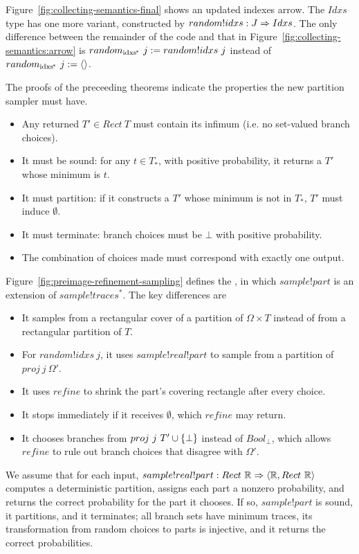 Figure~\ref{fig:collecting-semantics-final} shows an updated indexes arrow.
The $Idxs$ type has one more variant, constructed by $random!idxs : J \Rightarrow Idxs$.
The only difference between the remainder of the code and that in Figure~\ref{fig:collecting-semantics:arrow} is $random_\mathrm{idxs^{\mspace{-2mu}*}}~j := random!idxs~j$ instead of $random_\mathrm{idxs^{\mspace{-2mu}*}}~j := \langle{}\rangle$.

The proofs of the preceeding theorems indicate the properties the new partition sampler must have.
\begin{itemize}
	\item Any returned $T' \in Rect~T$ must contain its infimum (i.e. no set-valued branch choices).
	\item It must be sound: for any $t \in T_*$, with positive probability, it returns a $T'$ whose minimum is $t$.
	\item It must partition: if it constructs a $T'$ whose minimum is not in $T_*$, $T'$ must induce $\emptyset$.
	\item It must terminate: branch choices must be $\bot$ with positive probability.
	\item The combination of choices made must correspond with exactly one output.
\end{itemize}

Figure~\ref{fig:preimage-refinement-sampling} defines the , in which $sample!part$ is an extension of $sample!traces^*$.
The key differences are
\begin{itemize}
	\item It samples from a rectangular cover of a partition of $\Omega \times T$ instead of from a rectangular partition of $T$.
	\item For $random!idxs~j$, it uses $sample!real!part$ to sample from a partition of $proj~j~\Omega'$.
	\item It uses $refine$ to shrink the part's covering rectangle after every choice.
	\item It stops immediately if it receives $\emptyset$, which $refine$ may return.
	\item It chooses branches from $proj~j~T' \cup \{{\bot}\}$ instead of $Bool_\bot$, which allows $refine$ to rule out branch choices that disagree with $\Omega'$.
\end{itemize}
We assume that for each input, $sample!real!part : Rect~\mathbb{R} \Rightarrow \langle{\mathbb{R}, Rect~\mathbb{R}}\rangle$ computes a deterministic partition, assigns each part a nonzero probability, and returns the correct probability for the part it chooses.
If so, $sample!part$ is sound, it partitions, and it terminates; all branch sets have minimum traces, its transformation from random choices to parts is injective, and it returns the correct probabilities.

